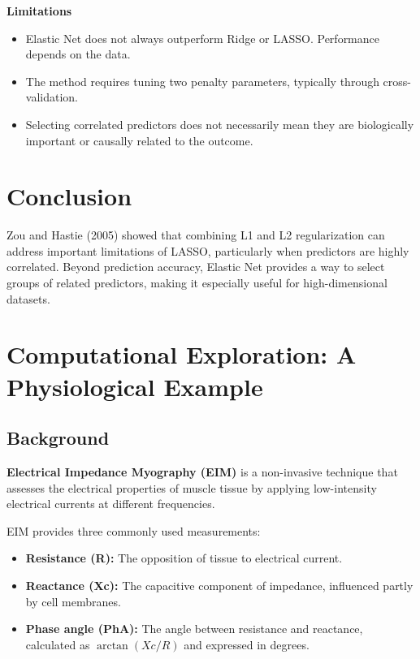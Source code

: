 \documentclass[
  letterpaper,
  DIV=11,
  numbers=noendperiod]{scrreprt}
\providecommand{\tightlist}{%
  \setlength{\itemsep}{0pt}\setlength{\parskip}{0pt}}
\begin{document}
\textbf{Limitations}

\begin{itemize}
\tightlist
\item
  Elastic Net does not always outperform Ridge or LASSO. Performance
  depends on the data.
\item
  The method requires tuning two penalty parameters, typically through
  cross-validation.
\item
  Selecting correlated predictors does not necessarily mean they are
  biologically important or causally related to the outcome.
\end{itemize}

\section{Conclusion}\label{conclusion}

Zou and Hastie (2005) showed that combining L1 and L2 regularization can
address important limitations of LASSO, particularly when predictors are
highly correlated. Beyond prediction accuracy, Elastic Net provides a
way to select groups of related predictors, making it especially useful
for high-dimensional datasets.

\section{Computational Exploration: A Physiological
Example}\label{computational-exploration-a-physiological-example}

\subsection{Background}\label{background}

\textbf{Electrical Impedance Myography (EIM)} is a non-invasive
technique that assesses the electrical properties of muscle tissue by
applying low-intensity electrical currents at different frequencies.

EIM provides three commonly used measurements:

\begin{itemize}
\tightlist
\item
  \textbf{Resistance (R):} The opposition of tissue to electrical
  current.
\item
  \textbf{Reactance (Xc):} The capacitive component of impedance,
  influenced partly by cell membranes.
\item
  \textbf{Phase angle (PhA):} The angle between resistance and
  reactance, calculated as \(\arctan(Xc/R)\) and expressed in degrees.
\end{itemize}
\end{document}
